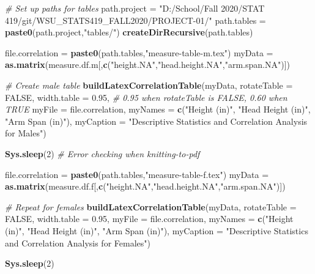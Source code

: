 \documentclass[]{article}
\newenvironment{Shaded}{\begin{snugshade}}{\end{snugshade}}
\newcommand{\CommentTok}[1]{\textcolor[rgb]{0.56,0.35,0.01}{\textit{#1}}}
\newcommand{\DataTypeTok}[1]{\textcolor[rgb]{0.13,0.29,0.53}{#1}}
\newcommand{\DecValTok}[1]{\textcolor[rgb]{0.00,0.00,0.81}{#1}}
\newcommand{\FloatTok}[1]{\textcolor[rgb]{0.00,0.00,0.81}{#1}}
\newcommand{\KeywordTok}[1]{\textcolor[rgb]{0.13,0.29,0.53}{\textbf{#1}}}
\newcommand{\NormalTok}[1]{#1}
\newcommand{\OtherTok}[1]{\textcolor[rgb]{0.56,0.35,0.01}{#1}}
\newcommand{\StringTok}[1]{\textcolor[rgb]{0.31,0.60,0.02}{#1}}
\begin{document}
\begin{Shaded}
\begin{Highlighting}[]
\CommentTok{\# Set up paths for tables}
\NormalTok{path.project =}\StringTok{ "D:/School/Fall 2020/STAT 419/git/WSU\_STATS419\_FALL2020/PROJECT{-}01/"}
\NormalTok{path.tables =}\StringTok{ }\KeywordTok{paste0}\NormalTok{(path.project,}\StringTok{"tables/"}\NormalTok{)}
  \KeywordTok{createDirRecursive}\NormalTok{(path.tables)}

\NormalTok{file.correlation =}\StringTok{ }\KeywordTok{paste0}\NormalTok{(path.tables,}\StringTok{"measure{-}table{-}m.tex"}\NormalTok{) }
\NormalTok{myData =}\StringTok{ }\KeywordTok{as.matrix}\NormalTok{(measure.df.m[,}\KeywordTok{c}\NormalTok{(}\StringTok{"height.NA"}\NormalTok{,}\StringTok{"head.height.NA"}\NormalTok{,}\StringTok{"arm.span.NA"}\NormalTok{)])}

\CommentTok{\# Create male table}
\KeywordTok{buildLatexCorrelationTable}\NormalTok{(myData, }
  \DataTypeTok{rotateTable =} \OtherTok{FALSE}\NormalTok{,}
  \DataTypeTok{width.table =} \FloatTok{0.95}\NormalTok{, }\CommentTok{\# 0.95 when rotateTable is FALSE, 0.60 when TRUE}
  \DataTypeTok{myFile =}\NormalTok{ file.correlation,}
  \DataTypeTok{myNames =} \KeywordTok{c}\NormalTok{(}\StringTok{"Height (in)"}\NormalTok{, }\StringTok{"Head Height (in)"}\NormalTok{, }\StringTok{"Arm Span (in)"}\NormalTok{),}
  \DataTypeTok{myCaption =} \StringTok{"Descriptive Statistics and Correlation Analysis for Males"}\NormalTok{)}

\KeywordTok{Sys.sleep}\NormalTok{(}\DecValTok{2}\NormalTok{) }\CommentTok{\# Error checking when knitting{-}to{-}pdf}

\NormalTok{file.correlation =}\StringTok{ }\KeywordTok{paste0}\NormalTok{(path.tables,}\StringTok{"measure{-}table{-}f.tex"}\NormalTok{)}
\NormalTok{myData =}\StringTok{ }\KeywordTok{as.matrix}\NormalTok{(measure.df.f[,}\KeywordTok{c}\NormalTok{(}\StringTok{"height.NA"}\NormalTok{,}\StringTok{"head.height.NA"}\NormalTok{,}\StringTok{"arm.span.NA"}\NormalTok{)])}

\CommentTok{\# Repeat for females}
\KeywordTok{buildLatexCorrelationTable}\NormalTok{(myData, }
  \DataTypeTok{rotateTable =} \OtherTok{FALSE}\NormalTok{,}
  \DataTypeTok{width.table =} \FloatTok{0.95}\NormalTok{,}
  \DataTypeTok{myFile =}\NormalTok{ file.correlation,}
  \DataTypeTok{myNames =} \KeywordTok{c}\NormalTok{(}\StringTok{"Height (in)"}\NormalTok{, }\StringTok{"Head Height (in)"}\NormalTok{, }\StringTok{"Arm Span (in)"}\NormalTok{),}
  \DataTypeTok{myCaption =} \StringTok{"Descriptive Statistics and Correlation Analysis for Females"}\NormalTok{)}

\KeywordTok{Sys.sleep}\NormalTok{(}\DecValTok{2}\NormalTok{)}
\end{Highlighting}
\end{Shaded}
\end{document}
